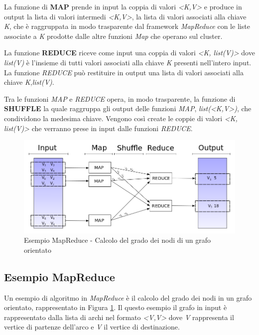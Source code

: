 \documentclass[LaM,binding=0.6cm]{sapthesis}
\begin{document}
La funzione di \textbf{MAP} prende in input la coppia di valori \textit{<K,V>} e produce in output la lista di valori intermedi \textit{<K,V>}, la lista di valori associati alla chiave \textit{K}, che è raggruppata in modo trasparente dal framework \textit{MapReduce} con le liste associate a \textit{K} prodotte dalle altre funzioni \textit{Map} che operano sul cluster.
 
La funzione \textbf{REDUCE} riceve come input una coppia di valori \textit{<K,  list(V)>} dove \textit{list(V)} è l'insieme di tutti valori  associati alla chiave \textit{K} presenti nell'intero input.
La funzione \textit{REDUCE} può restituire in output una lista di valori associati alla chiave \textit{K},\textit{list(V)}.

Tra le funzioni \textit{MAP} e \textit{REDUCE} opera, in modo trasparente, la funzione di \textbf{SHUFFLE} la quale raggruppa gli output delle funzioni \textit{MAP}, \textit{list(<K,V>)},  che condividono la medesima chiave. Vengono così create le coppie di valori \textit{<K, list(V)>} che verranno prese in input dalle funzioni \textit{REDUCE}.

\begin{figure}
\centering
\includegraphics[width=1\textwidth]{esempio_degree}
\caption{Esempio MapReduce - Calcolo del grado dei nodi di un grafo orientato}
\label{fig:SchemaMapReduce}
\end{figure}


\subsection{Esempio MapReduce}

Un esempio di algoritmo in \textit{MapReduce} è il calcolo del grado dei nodi in un grafo orientato, rappresentato in Figura \ref{fig:SchemaMapReduce}. Il questo esempio il grafo in input è rappresentato dalla lista di archi nel formato \textit{<V,V>} dove \textit{V} rappresenta il vertice di partenze dell'arco e \textit{V} il vertice di destinazione.
\end{document}
